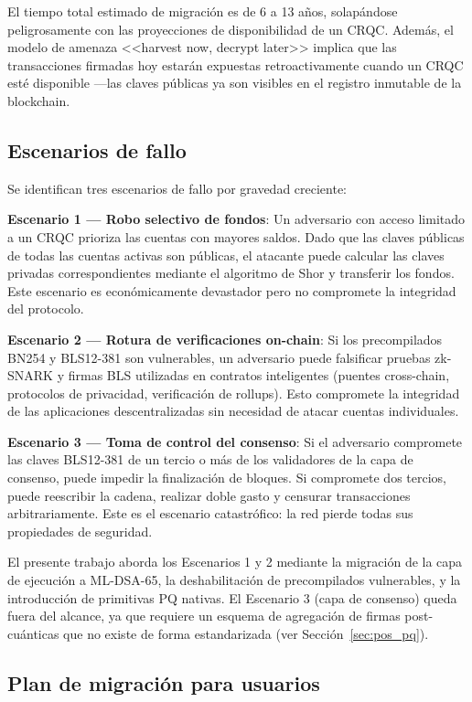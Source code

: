 El tiempo total estimado de migración es de 6 a 13 años, solapándose peligrosamente con las proyecciones de disponibilidad de un CRQC. Además, el modelo de amenaza <<harvest now, decrypt later>> implica que las transacciones firmadas hoy estarán expuestas retroactivamente cuando un CRQC esté disponible ---las claves públicas ya son visibles en el registro inmutable de la blockchain.

\subsection{Escenarios de fallo}

Se identifican tres escenarios de fallo por gravedad creciente:

\textbf{Escenario 1 --- Robo selectivo de fondos}: Un adversario con acceso limitado a un CRQC prioriza las cuentas con mayores saldos. Dado que las claves públicas de todas las cuentas activas son públicas, el atacante puede calcular las claves privadas correspondientes mediante el algoritmo de Shor y transferir los fondos. Este escenario es económicamente devastador pero no compromete la integridad del protocolo.

\textbf{Escenario 2 --- Rotura de verificaciones on-chain}: Si los precompilados BN254 y BLS12-381 son vulnerables, un adversario puede falsificar pruebas zk-SNARK y firmas BLS utilizadas en contratos inteligentes (puentes cross-chain, protocolos de privacidad, verificación de rollups). Esto compromete la integridad de las aplicaciones descentralizadas sin necesidad de atacar cuentas individuales.

\textbf{Escenario 3 --- Toma de control del consenso}: Si el adversario compromete las claves BLS12-381 de un tercio o más de los validadores de la capa de consenso, puede impedir la finalización de bloques. Si compromete dos tercios, puede reescribir la cadena, realizar doble gasto y censurar transacciones arbitrariamente. Este es el escenario catastrófico: la red pierde todas sus propiedades de seguridad.

El presente trabajo aborda los Escenarios 1 y 2 mediante la migración de la capa de ejecución a ML-DSA-65, la deshabilitación de precompilados vulnerables, y la introducción de primitivas PQ nativas. El Escenario 3 (capa de consenso) queda fuera del alcance, ya que requiere un esquema de agregación de firmas post-cuánticas que no existe de forma estandarizada (ver Sección~\ref{sec:pos_pq}).

\subsection{Plan de migración para usuarios}
\label{sec:migration_plan}

